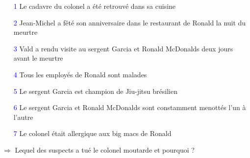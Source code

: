 \begin{frame}

\begin{itemize}

	\item[\textcolor{blue}1] Le cadavre du colonel a été retrouvé dans sa cuisine \pause

    \item[\textcolor{blue}2] Jean-Michel a fêté son anniversaire dans le restaurant de Ronald la nuit du meurtre\pause

	\item[\textcolor{blue}3] Vald a rendu visite au sergent Garcia et Ronald McDonalds deux jours avant le meurtre\pause

     \item[\textcolor{blue}4] Tous les employés de Ronald sont malades \pause

     \item[\textcolor{blue}5] Le sergent Garcia est champion de Jiu-jitsu brésilien\pause
 
	\item[\textcolor{blue}6] Le sergent Garcia et Ronald McDonalds sont constamment menottés l'un à l'autre\pause
	
	\item[\textcolor{blue}7] Le colonel était allergique aux big macs de Ronald\pause

\end{itemize}

$\Rightarrow$ Lequel des suspects a tué le colonel moutarde et pourquoi ?

\end{frame}


